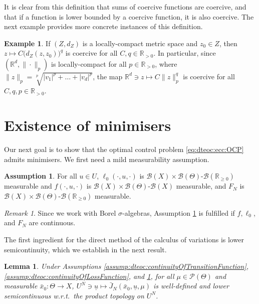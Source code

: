 \documentclass[letterpaper, 10 pt, conference]{IEEEconf}  %
\newcommand{\R}{\mathbb{R}} %
\newcommand{\Rnn}{\mathbb{R}_{\geq 0}} %
\newcommand{\Rp}{\mathbb{R}_{>0}} %
\newcommand{\Borel}{\mathcal{B}} %
\newcommand{\Pbs}{\mathcal{P}} %
\newcommand{\es}{\bar{x}} %
\newcommand{\is}[1]{{\underline{#1}}} %
\theoremstyle{theorem}
\newtheorem{lemma}[theorem]{Lemma}
\theoremstyle{definition}
\newtheorem{assumption}{Assumption}
\newtheorem{example}{Example}
\theoremstyle{remark}
\newtheorem{remark}{Remark}
\begin{document}
It is clear from this definition that sums of coercive functions are coercive,
and that if a function is lower bounded by a coercive function, it is also coercive.
The next example provides more concrete instances of this definition.
\begin{example} \label{ex:dteco:ecc:coercivity}
If $(Z,d_Z)$ is a locally-compact metric space and $z_0 \in Z$, then $z \mapsto C \big(d_Z(z,z_0)\big)^q$ is coercive for all $C,q\in\Rp$.
In particular, since $(\R^d, \|\cdot\|_p)$ is locally-compact for all $p\in\Rp$, where $\|z\|_p=\sqrt[p]{|v_1|^p + \ldots +|v_d|^p}$, 
the map $\R^d \ni z \mapsto C \|z\|_p^q$ is coercive for all $C,q,p\in\Rp$.
\end{example}

\section{Existence of minimisers} \label{sec:ecc:existenceMinimisers}
Our next goal is to show that the optimal control problem \eqref{eq:dteoc:ecc:OCP} admits minimisers.
We first need a mild measurability assumption.
\begin{assumption} \label{assump:dteoc:ecc:measurability}
For all $u \in U$, $\ell_0(\cdot,u,\cdot)$ is $\Borel(X)\times\Borel(\Theta)$-$\Borel(\Rnn)$ measurable and $f(\cdot,u,\cdot)$ is $\Borel(X)\times\Borel(\Theta)$-$\Borel(X)$ measurable,
and $F_N$ is $\Borel(X)\times\Borel(\Theta)$-$\Borel(\Rnn)$ measurable.
\end{assumption}
\begin{remark}
Since we work with Borel $\sigma$-algebras, Assumption \ref{assump:dteoc:ecc:measurability} is fulfilled if $f,\ell_0$, and $F_N$ are continuous.
\end{remark}
The first ingredient for the direct method of the calculus of variations is lower semicontinuity, which we establish in the next result.
\begin{lemma} \label{lem:dteoc:lscOfCostFunctional}
Under Assumptions \ref{assump:dteoc:continuityOfTransitionFunction}, \ref{assump:dteoc:continuityOfLossFunction}, and \ref{assump:dteoc:ecc:measurability},
for all $\mu \in \Pbs(\Theta)$ and measurable $\es_0 \colon \Theta\rightarrow X$, 
$U^N \ni \is{u} \mapsto \bar J_N(\es_0, \is{u} ,\mu)$ is well-defined and lower semicontinuous w.r.t.~the product topology on $U^N$.
\end{lemma}
\end{document}
